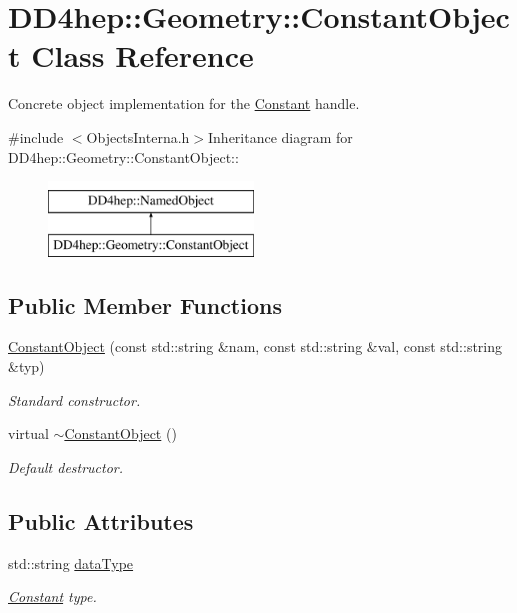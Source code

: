 \hypertarget{class_d_d4hep_1_1_geometry_1_1_constant_object}{
\section{DD4hep::Geometry::ConstantObject Class Reference}
\label{class_d_d4hep_1_1_geometry_1_1_constant_object}
}


Concrete object implementation for the \hyperlink{class_d_d4hep_1_1_geometry_1_1_constant}{Constant} handle.  


{\ttfamily \#include $<$ObjectsInterna.h$>$}Inheritance diagram for DD4hep::Geometry::ConstantObject::\begin{figure}[H]
\begin{center}
\leavevmode
\includegraphics[height=2cm]{class_d_d4hep_1_1_geometry_1_1_constant_object}
\end{center}
\end{figure}
\subsection*{Public Member Functions}
\begin{DoxyCompactItemize}
\item 
\hyperlink{class_d_d4hep_1_1_geometry_1_1_constant_object_ac91134bd94fcfc9599b6c53a6b2e11f7}{ConstantObject} (const std::string \&nam, const std::string \&val, const std::string \&typ)
\begin{DoxyCompactList}\small\item\em Standard constructor. \item\end{DoxyCompactList}\item 
virtual \hyperlink{class_d_d4hep_1_1_geometry_1_1_constant_object_af524dd1ddcc810be603b62808042d0cb}{$\sim$ConstantObject} ()
\begin{DoxyCompactList}\small\item\em Default destructor. \item\end{DoxyCompactList}\end{DoxyCompactItemize}
\subsection*{Public Attributes}
\begin{DoxyCompactItemize}
\item 
std::string \hyperlink{class_d_d4hep_1_1_geometry_1_1_constant_object_afa7868ea6bab516b7cd63ac1c9537e5c}{dataType}
\begin{DoxyCompactList}\small\item\em \hyperlink{class_d_d4hep_1_1_geometry_1_1_constant}{Constant} type. \item\end{DoxyCompactList}\end{DoxyCompactItemize}
